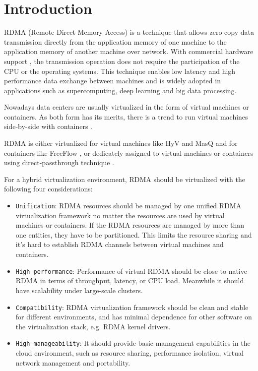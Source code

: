 \section{Introduction}
RDMA (Remote Direct Memory Access) is a technique that allows zero-copy data transmission directly from the application memory of one machine to the application memory of another machine over network. With commercial hardware support \cite{roce, iwarp, infiniband}, the transmission operation does not require the participation of the CPU or the operating systems. This technique enables low latency and high performance data exchange between machines and is widely adopted in applications such as supercomputing, deep learning and big data processing.

Nowadays data centers are usually virtualized in the form of virtual machines or containers. As both form has its merits, there is a trend to run virtual machines side-by-side with containers \cite{rethinkingvirtualization}.

RDMA is either virtualized for virtual machines like HyV \cite{pfefferle2015hybrid} and MasQ \cite{he2020masq} and for containers like FreeFlow \cite{kim2019freeflow}, or dedicately assigned to virtual machines or containers using direct-passthrough technique \cite{sr-iov}.

For a hybrid virtualization environment, RDMA should be virtualized with the following four considerations:

\begin{itemize}
	\item {\verb|Unification|}: RDMA resources should be managed by one unified RDMA virtualization framework no matter the resources are used by virtual machines or containers. If the RDMA resources are managed by more than one entities, they have to be partitioned. This limits the resource sharing and it's hard to establish RDMA channels between virtual machines and containers.
	\item {\verb|High performance|}: Performance of virtual RDMA should be close to native RDMA in terms of throughput, latency, or CPU load. Meanwhile it should have scalability under large-scale clusters.
	\item {\verb|Compatibility|}: RDMA virtualization framework should be clean and stable for different environments, and has minimal dependence for other software on the virtualization stack, e.g. RDMA kernel drivers.
	\item {\verb|High manageability|}: It should provide basic management capabilities in the cloud environment, such as resource sharing, performance isolation, virtual network management and portability.
\end{itemize}

